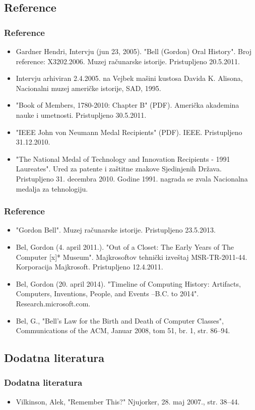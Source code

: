 \documentclass{beamer}
\begin{document}
\subsection{Reference}
\begin{frame}[fragile]\frametitle{Reference}
	\begin{itemize}			
		\item  Gardner Hendri, Intervju (jun 23, 2005). "Bell (Gordon) Oral History". Broj reference: X3202.2006. Muzej računarske istorije. Pristupljeno 20.5.2011.
		\item  Intervju arhiviran 2.4.2005. na Vejbek mašini kustosa Davida K. Alisona, Nacionalni muzej američke istorije, SAD, 1995.
		\item "Book of Members, 1780-2010: Chapter B" (PDF). Američka akademina nauke i umetnosti. Pristupljeno 30.5.2011.
		\item "IEEE John von Neumann Medal Recipients" (PDF). IEEE. Pristupljeno 31.12.2010.
		\item  "The National Medal of Technology and Innovation Recipients - 1991 Laureates". Ured za patente i zaštitne znakove Sjedinjenih Država. Pristupljeno 31. decembra 2010. Godine 1991. nagrada se zvala Nacionalna medalja za tehnologiju.
	\end{itemize}
\end{frame}
\begin{frame}[fragile]\frametitle{Reference}
	\begin{itemize}			
		\item  "Gordon Bell". Muzej računarske istorije. Pristupljeno 23.5.2013.	\item  Bel, Gordon (4. april 2011.). "Out of a Closet: The Early Years of The Computer [x]* Museum". Majkrosoftov tehnički izveštaj MSR-TR-2011-44. Korporacija Majkrosoft. Pristupljeno 12.4.2011.
		\item  Bel, Gordon (20. april 2014). "Timeline of Computing History: Artifacts, Computers, Inventions, People, and Events --B.C. to 2014". Research.microsoft.com.
		\item  Bel, G., "Bell’s Law for the Birth and Death of Computer Classes", Communications of the ACM, Januar 2008, tom 51, br. 1, str. 86–94.
	\end{itemize}
\end{frame}

\subsection{Dodatna literatura}
\begin{frame}[fragile]\frametitle{Dodatna literatura}
	\begin{itemize}	
		\item Vilkinson, Alek, "Remember This?" Njujorker, 28. maj 2007., str. 38–44.
	\end{itemize}
\end{frame}
\end{document}
